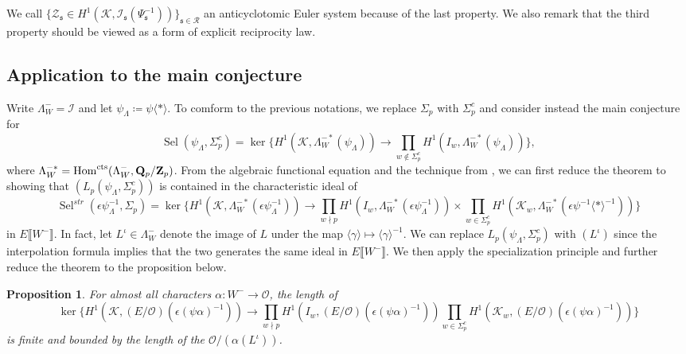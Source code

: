 \documentclass[leqno]{amsart}
\newtheorem{prop}[thm]{Proposition}
\theoremstyle{definition}
\theoremstyle{remark}
\newcommand{\oo}{\mathcal{O}}
\newcommand{\Qp}{\mathbf{Q}_p}
\newcommand{\Zp}{\mathbf{Z}_p}
\DeclareMathOperator{\Hom}{Hom}
\newcommand{\cts}{\textnormal{cts}}
\newcommand{\fs}{\mathfrak{s}}
\newcommand{\K}{{\mathcal{K}}} %
\newcommand{\I}{\mathcal{I}} %
\DeclareMathOperator{\Sel}{Sel}
\begin{document}
We call $\{\mathcal{Z}_\fs\in H^1(\K, \I_\fs(\Psi_\fs^{-1}))\}_{\fs\in\mathcal{R}}$
an anticyclotomic Euler system because
of the last property.
We also remark that the third property
should be viewed as a form of explicit reciprocity law.


\subsection{Application to the main conjecture}


Write $\Lambda_W^-=\I$ and let $\psi_\Lambda\coloneqq\psi\langle*\rangle$.
To comform to the previous notations, we replace $\Sigma_p$
with $\Sigma_p^c$ and consider instead the main conjecture for 
\[
\Sel(\psi_\Lambda,\Sigma_p^c)=\ker
    \big\{
    H^1(\K, \Lambda_W^{-*}(\psi_\Lambda))\to \prod_{w\notin \Sigma_p^c}
    H^1(I_w, \Lambda_W^{-*}(\psi_\Lambda))
    \big\},
\]
where $\Lambda_W^{-*}=\Hom^{\cts}(\Lambda_W^{-}, \Qp/\Zp)$.
From the algebraic functional equation 
and the technique from \cite{Hsieh2010}, 
we can first reduce the theorem to showing that
$(L_p(\psi_\Lambda, \Sigma_p^c))$ 
is contained in the characteristic ideal of
\begin{equation*}
    \Sel^{str}(\epsilon\psi^{-1}_\Lambda,\Sigma_p)=
    \ker\big\{
    H^1(\K,\Lambda_W^{-*}(\epsilon\psi^{-1}_\Lambda))\to 
    \prod_{w\nmid p}
    H^1(I_w,\Lambda_W^{-*}(\epsilon\psi^{-1}_\Lambda))\times
    \prod_{w\in \Sigma_p^c}
    H^1(\K_w,\Lambda_W^{-*}(\epsilon\psi^{-1}\langle*\rangle^{-1}))
    \big\}
\end{equation*}
in $E\llbracket W^-\rrbracket$.
In fact, let $L^\iota\in \Lambda_W^-$
denote the image of $L$ under the map
$\langle\gamma\rangle\mapsto \langle\gamma\rangle^{-1}$.
We can replace $L_p(\psi_\Lambda, \Sigma_p^c)$ with $(L^\iota)$
since the interpolation formula implies that the two 
generates the same ideal in $E\llbracket W^-\rrbracket$.
We then apply 
the specialization principle \cite{Och05} and further
reduce the theorem to the proposition below.
\begin{prop}
    For almost all characters $\alpha\colon W^-\to \oo$, the length of
    \begin{equation*}
\ker\big\{
H^1(\K, (E/\oo)(\epsilon(\psi\alpha)^{-1}))\to
\prod_{w\nmid p}
H^1(I_w,(E/\oo)(\epsilon(\psi\alpha)^{-1}))
\prod_{w\in\Sigma_p^c}
H^1(\K_w,(E/\oo)(\epsilon(\psi\alpha)^{-1}))
\big\}
\end{equation*}
is finite and bounded by the length of  the $\oo/(\alpha(L^\iota))$.
\end{prop}
\end{document}
